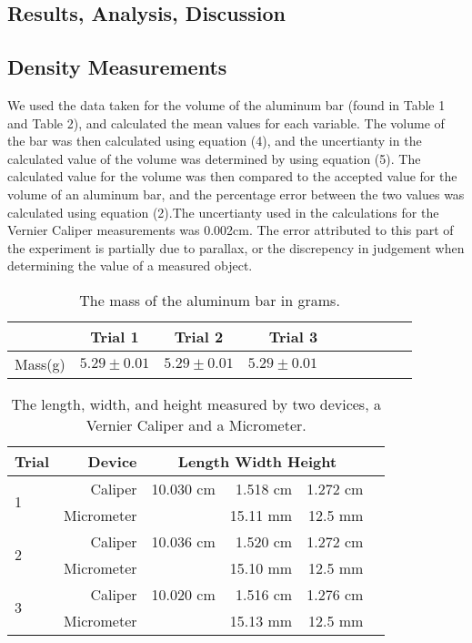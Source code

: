 \documentclass[twoside,10pt]{article}
\begin{document}
\begin{multicols}{2}
		\section{Results, Analysis, Discussion}
		\subsection{Density Measurements}
		We used the data taken for the volume of the aluminum bar (found in Table 1 and Table 2), and calculated the mean values for each variable. The volume of the bar was then calculated using equation (4), and the uncertianty in the calculated value of the volume was determined by using equation (5). The calculated value for the volume was then compared to the accepted value for the volume of an aluminum bar, and the percentage error between the two values was calculated using equation (2).The uncertianty used in the calculations for the Vernier Caliper measurements was 0.002cm. The error attributed to this part of the experiment is partially due to parallax, or the discrepency in judgement when determining the value of a measured object. 
		
		
		\begin{table}[H]
			\centering
			\begin{tabular}{l c c rrrrrrr}
				\hline \hline
				 & Trial 1 & Trial 2 & Trial 3 \\ [1ex]
				\hline
				\multirow{2}{*}{Mass(g)} & \multirow{2}{*}{\(5.29 \pm 0.01\)} & \multirow{2}{*}{\(5.29 \pm 0.01\)} &\multirow{2}{*}{\(5.29 \pm 0.01\)} \\ [1.5ex]
				\hline
			\end{tabular}
		\caption{The mass of the aluminum bar in grams.}
		\end{table}
		
\begin{table}[H]
	\centering
	\begin{tabular}{lrrrrr}
			\hline \hline
		Trial   &   Device    &   \multicolumn{3}{c}{Length \hspace{5mm} Width \hspace{5mm} Height}  \\[1ex]
		\hline
		\multirow{2}{*}{1} & Caliper & 10.030 cm  & 1.518 cm  & 1.272 cm \\
		& Micrometer &  & 15.11 mm  & 12.5 mm \\ [1.5ex]
		\multirow{2}{*}{2} & Caliper & 10.036 cm & 1.520 cm & 1.272 cm\\
		& Micrometer &  & 15.10 mm & 12.5 mm\\ [1.5ex]
		\multirow{2}{*}{3} & Caliper & 10.020 cm & 1.516 cm & 1.276 cm\\
		& Micrometer &  & 15.13 mm & 12.5 mm\\ [1.5ex]
		\hline
	\end{tabular}
	\caption{The length, width, and height measured by two devices, a Vernier Caliper and a Micrometer.}
\end{table}


\end{multicols}
\end{document}
